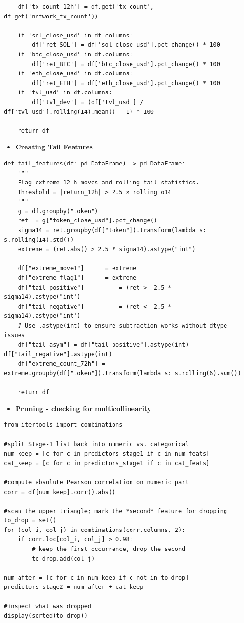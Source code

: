 \documentclass[
  a4paper,
  DIV=11,
  numbers=noendperiod]{scrreprt}
\providecommand{\tightlist}{%
  \setlength{\itemsep}{0pt}\setlength{\parskip}{0pt}}
\begin{document}
\begin{verbatim}
    df['tx_count_12h'] = df.get('tx_count', df.get('network_tx_count'))

    if 'sol_close_usd' in df.columns:
        df['ret_SOL'] = df['sol_close_usd'].pct_change() * 100
    if 'btc_close_usd' in df.columns:
        df['ret_BTC'] = df['btc_close_usd'].pct_change() * 100
    if 'eth_close_usd' in df.columns:
        df['ret_ETH'] = df['eth_close_usd'].pct_change() * 100
    if 'tvl_usd' in df.columns:
        df['tvl_dev'] = (df['tvl_usd'] / df['tvl_usd'].rolling(14).mean() - 1) * 100

    return df
\end{verbatim}

\begin{itemize}
\tightlist
\item
  \textbf{Creating Tail Features}
\end{itemize}

\begin{verbatim}
def tail_features(df: pd.DataFrame) -> pd.DataFrame:
    """
    Flag extreme 12-h moves and rolling tail statistics.
    Threshold = |return_12h| > 2.5 × rolling σ14
    """
    g = df.groupby("token")
    ret  = g["token_close_usd"].pct_change()
    sigma14 = ret.groupby(df["token"]).transform(lambda s: s.rolling(14).std())
    extreme = (ret.abs() > 2.5 * sigma14).astype("int")

    df["extreme_move1"]      = extreme
    df["extreme_flag1"]      = extreme
    df["tail_positive"]          = (ret >  2.5 * sigma14).astype("int")
    df["tail_negative"]          = (ret < -2.5 * sigma14).astype("int")
    # Use .astype(int) to ensure subtraction works without dtype issues
    df["tail_asym"] = df["tail_positive"].astype(int) - df["tail_negative"].astype(int)
    df["extreme_count_72h"] = extreme.groupby(df["token"]).transform(lambda s: s.rolling(6).sum())

    return df
\end{verbatim}

\begin{itemize}
\tightlist
\item
  \textbf{Pruning - checking for multicollinearity}
\end{itemize}

\begin{verbatim}
from itertools import combinations

#split Stage-1 list back into numeric vs. categorical
num_keep = [c for c in predictors_stage1 if c in num_feats]
cat_keep = [c for c in predictors_stage1 if c in cat_feats]

#compute absolute Pearson correlation on numeric part
corr = df[num_keep].corr().abs()

#scan the upper triangle; mark the *second* feature for dropping
to_drop = set()
for (col_i, col_j) in combinations(corr.columns, 2):
    if corr.loc[col_i, col_j] > 0.98:
        # keep the first occurrence, drop the second
        to_drop.add(col_j)

num_after = [c for c in num_keep if c not in to_drop]
predictors_stage2 = num_after + cat_keep

#inspect what was dropped
display(sorted(to_drop))
\end{verbatim}
\end{document}
